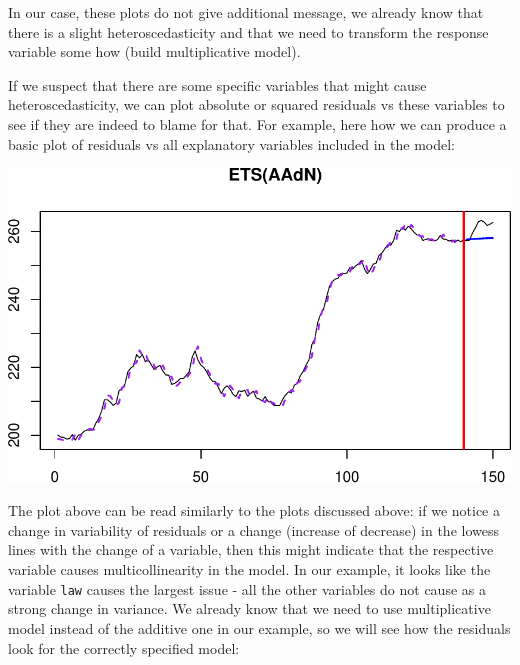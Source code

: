 \documentclass[
]{book}
\newenvironment{Shaded}{\begin{snugshade}}{\end{snugshade}}
\newcommand{\AttributeTok}[1]{\textcolor[rgb]{0.77,0.63,0.00}{#1}}
\newcommand{\ConstantTok}[1]{\textcolor[rgb]{0.00,0.00,0.00}{#1}}
\newcommand{\DecValTok}[1]{\textcolor[rgb]{0.00,0.00,0.81}{#1}}
\newcommand{\FunctionTok}[1]{\textcolor[rgb]{0.00,0.00,0.00}{#1}}
\newcommand{\NormalTok}[1]{#1}
\newcommand{\SpecialCharTok}[1]{\textcolor[rgb]{0.00,0.00,0.00}{#1}}
\theoremstyle{definition}
\theoremstyle{definition}
\theoremstyle{definition}
\theoremstyle{definition}
\theoremstyle{remark}
\begin{document}
In our case, these plots do not give additional message, we already know that there is a slight heteroscedasticity and that we need to transform the response variable some how (build multiplicative model).

If we suspect that there are some specific variables that might cause heteroscedasticity, we can plot absolute or squared residuals vs these variables to see if they are indeed to blame for that. For example, here how we can produce a basic plot of residuals vs all explanatory variables included in the model:

\begin{Shaded}
\end{Shaded}

\includegraphics{adam_files/figure-latex/unnamed-chunk-163-1.pdf}

The plot above can be read similarly to the plots discussed above: if we notice a change in variability of residuals or a change (increase of decrease) in the lowess lines with the change of a variable, then this might indicate that the respective variable causes multicollinearity in the model. In our example, it looks like the variable \texttt{law} causes the largest issue - all the other variables do not cause as a strong change in variance. We already know that we need to use multiplicative model instead of the additive one in our example, so we will see how the residuals look for the correctly specified model:
\end{document}
